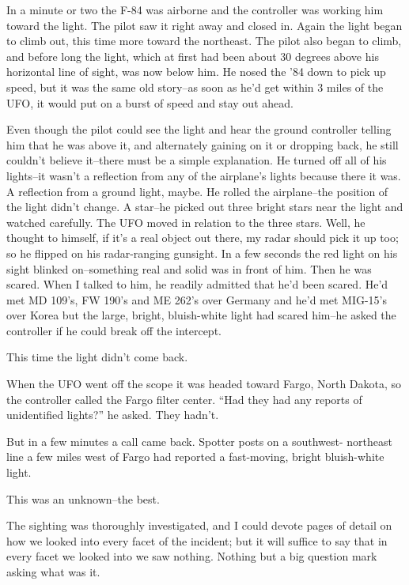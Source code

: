 \begin{svgraybox}
In a minute or two the F-84 was airborne and the controller was
working him toward the light. The pilot saw it right away and closed
in. Again the light began to climb out, this time more toward the
northeast. The pilot also began to climb, and before long the light,
which at first had been about 30 degrees above his horizontal line of
sight, was now below him. He nosed the '84 down to pick up speed, but
it was the same old story--as soon as he'd get within 3 miles of the
UFO, it would put on a burst of speed and stay out ahead.

Even though the pilot could see the light and hear the ground
controller telling him that he was above it, and alternately gaining
on it or dropping back, he still couldn't believe it--there must be a
simple explanation. He turned off all of his lights--it wasn't a
reflection from any of the airplane's lights because there it was. A
reflection from a ground light, maybe. He rolled the airplane--the
position of the light didn't change. A star--he picked out three
bright stars near the light and watched carefully. The UFO moved in
relation to the three stars. Well, he thought to himself, if it's a
real object out there, my radar should pick it up too; so he flipped
on his radar-ranging gunsight. In a few seconds the red light on his
sight blinked on--something real and solid was in front of him. Then
he was scared. When I talked to him, he readily admitted that he'd
been scared. He'd met MD 109's, FW 190's and ME 262's over Germany
and he'd met MIG-15's over Korea but the large, bright, bluish-white
light had scared him--he asked the controller if he could break off
the intercept.

This time the light didn't come back.

When the UFO went off the scope it was headed toward Fargo, North
Dakota, so the controller called the Fargo filter center. ``Had they
had any reports of unidentified lights?'' he asked. They hadn't.

But in a few minutes a call came back. Spotter posts on a southwest-
northeast line a few miles west of Fargo had reported a fast-moving,
bright bluish-white light.

This was an unknown--the best.

The sighting was thoroughly investigated, and I could devote pages
of detail on how we looked into every facet of the incident; but it
will suffice to say that in every facet we looked into we saw
nothing. Nothing but a big question mark asking what was it.
\end{svgraybox}

